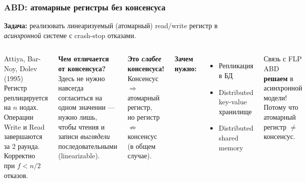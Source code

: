 \documentclass{beamer}
\begin{document}
\begin{frame}
\frametitle{ABD: атомарные регистры без консенсуса}

\textbf{Задача:} реализовать линеаризуемый (атомарный) read/write регистр
в \emph{асинхронной} системе с crash-stop отказами.

\vspace{0.3em}
\begin{columns}[T]
\begin{exampleblock}{Attiya, Bar-Noy, Dolev (1995)}
\small Регистр реплицируется на $n$ нодах. Операции Write и Read завершаются за 2 раунда. Корректно при $f < n/2$ отказов.
\end{exampleblock}

\vspace{0.4em}
\textbf{Чем отличается от консенсуса?}\\
\small Здесь не нужно навсегда согласиться на одном значении --- нужно лишь, чтобы чтения и записи \emph{выглядели} последовательными (linearizable).

\vspace{0.3em}
\textbf{Это \emph{слабее} консенсуса!}\\
\small Консенсус $\Rightarrow$ атомарный регистр,\\но регистр $\not\Rightarrow$ консенсус (в общем случае).

\textbf{Зачем нужно:}
\begin{itemize}
  \item Репликация в БД
  \item Distributed key-value хранилище
  \item Distributed shared memory
\end{itemize}

\vspace{0.4em}
\begin{alertblock}{Связь с FLP}
\small ABD \textbf{решаем} в асинхронной модели! Потому что атомарный регистр $\neq$ консенсус.
\end{alertblock}
\end{columns}
\end{frame}
\end{document}
